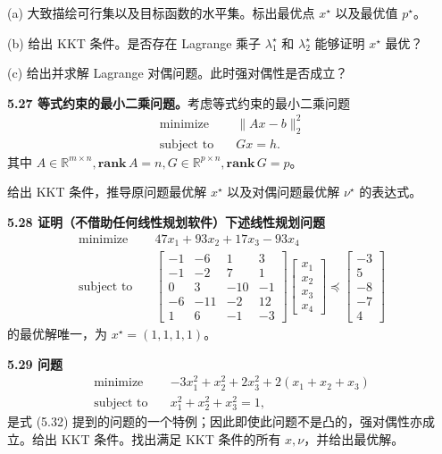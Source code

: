 \documentclass[UTF8,12pt,a4paper,fontset=fandol]{ctexart}
\begin{document}
(a) 大致描绘可行集以及目标函数的水平集。标出最优点 $x^\star$ 以及最优值 $p^\star$。

(b) 给出 KKT 条件。是否存在 Lagrange 乘子 $\lambda_1^\star$ 和 $\lambda_2^\star$ 能够证明 $x^\star$ 最优？

(c) 给出并求解 Lagrange 对偶问题。此时强对偶性是否成立？

\noindent\textbf{5.27 等式约束的最小二乘问题。}\quad 考虑等式约束的最小二乘问题
\[
\begin{aligned}
\text{minimize}\quad & \|Ax-b\|_2^2\\
\text{subject to}\quad & Gx=h.
\end{aligned}
\]
其中 $A\in\mathbb{R}^{m\times n}, \mathbf{rank}\,A=n, G\in\mathbb{R}^{p\times n}, \mathbf{rank}\,G=p$。

给出 KKT 条件，推导原问题最优解 $x^\star$ 以及对偶问题最优解 $\nu^\star$ 的表达式。

\noindent\textbf{5.28 证明（不借助任何线性规划软件）下述线性规划问题}
\[
\begin{aligned}
\text{minimize}\quad & 47x_1+93x_2+17x_3-93x_4\\
\text{subject to}\quad &
\begin{bmatrix}
-1 & -6 & 1 & 3\\
-1 & -2 & 7 & 1\\
0 & 3 & -10 & -1\\
-6 & -11 & -2 & 12\\
1 & 6 & -1 & -3
\end{bmatrix}
\begin{bmatrix}
x_1\\
x_2\\
x_3\\
x_4
\end{bmatrix}
\preceq
\begin{bmatrix}
-3\\
5\\
-8\\
-7\\
4
\end{bmatrix}
\end{aligned}
\]
的最优解唯一，为 $x^\star=(1,1,1,1)$。

\noindent\textbf{5.29 问题}
\[
\begin{aligned}
\text{minimize}\quad & -3x_1^2+x_2^2+2x_3^2+2(x_1+x_2+x_3)\\
\text{subject to}\quad & x_1^2+x_2^2+x_3^2=1,
\end{aligned}
\]
是式 (5.32) 提到的问题的一个特例；因此即使此问题不是凸的，强对偶性亦成立。给出 KKT 条件。找出满足 KKT 条件的所有 $x,\nu$，并给出最优解。
\end{document}
